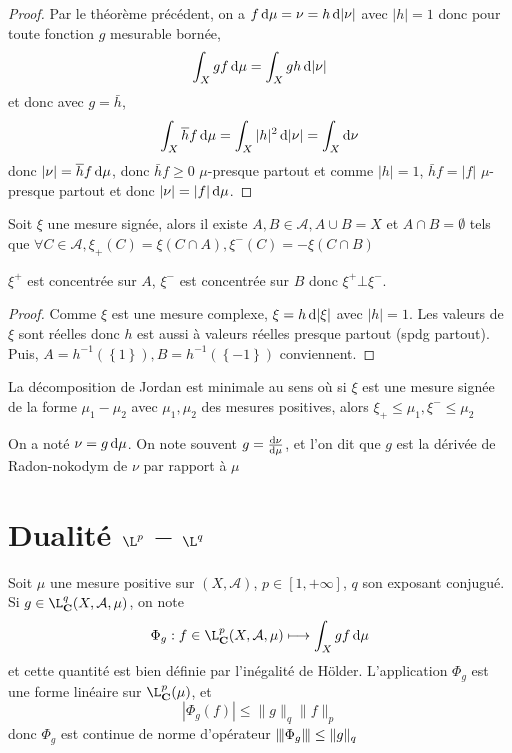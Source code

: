 \begin{proof}
Par le théorème précédent, on a $f\mathop{}\!\mathrm d \mu=\nu=h\mathop{}\!\mathrm d |\nu|$ avec $|h|=1$ donc pour toute fonction $g$ mesurable bornée, \[
\int_X gf\mathop{}\!\mathrm d\mu = \int_X gh\mathop{}\!\mathrm d |\nu|
\] 
et donc avec $g= \bar{h}$, \[
\int_X \overline{h}f\mathop{}\!\mathrm d\mu=\int_X |h|^2 \mathop{}\!\mathrm d |\nu|=\int_X \mathop{}\!\mathrm d \nu
\]
donc $|\nu|=\overline{h} f\mathop{}\!\mathrm d\mu$, donc $\bar{h} f\geq 0$ $\mu$-presque partout et comme  $|h|=1$,  $\bar{h}f=|f|$ $\mu$-presque partout et donc  $|\nu|=|f|\mathop{}\!\mathrm d \mu$.
\end{proof}

\begin{thm}
    Soit $\xi$ une mesure signée, alors il existe  $A, B \in  \mathcal  A, A\cup B=X$ et $A\cap B=\emptyset$ tels que  $\forall  C \in  \mathcal  A, \xi_+(C)=\xi(C\cap A), \xi^-(C)=-\xi(C\cap B)$
\end{thm}

\begin{rem}
$\xi^+$ est concentrée sur  $A$,  $\xi^-$ est concentrée sur  $B$ donc  $\xi^+\bot \xi^-$.
\end{rem}

\begin{proof}
    Comme $\xi$ est une mesure complexe,  $\xi=h\mathop{}\!\mathrm d |\xi|$ avec  $|h|=1$.  Les valeurs de $\xi$ sont réelles donc  $h$ est aussi à valeurs réelles presque partout (spdg partout). Puis, $A = h^{-1}(\left\{ 1 \right\} ), B = h^{-1}(\left\{ -1 \right\} )$ conviennent.
\end{proof}

\begin{prop}
La décomposition de Jordan est minimale au sens où si $\xi$ est une mesure signée de la forme  $\mu_1-\mu_2$ avec  $\mu_1, \mu_2$ des mesures positives, alors  $\xi_+\leq \mu_1, \xi^-\leq \mu_2$
\end{prop}

\begin{rem}
    On a noté $\nu = g\mathop{}\!\mathrm d \mu$. On note souvent  $g=\frac{\mathop{}\!\mathrm d \nu}{\mathop{}\!\mathrm d \mu}$, et l'on dit que  $g$ est la dérivée de Radon-nokodym de  $\nu$ par rapport à  $\mu$
\end{rem}

\section{Dualité \texorpdfstring{$\L^p$ -- $\L^q$}{L^p - L^q}}

Soit $\mu$ une mesure positive sur  $(X, \mathcal  A)$, $p \in  [1, +\infty]$, $q$ son exposant conjugué. Si  $g \in  \L^q_{\C}(X, \mathcal  A, \mu)$, on note \[
    \Phi_g:f \in  \L^p_{\C}(X, \mathcal  A, \mu)\longmapsto \int_X gf\diff\mu
\] 
et cette quantité est bien définie par l'inégalité de Hölder. L'application $\Phi_g$ est une forme linéaire sur  $\L^p_{\C}(\mu)$, et \[
    |\Phi_g(f)|\leq \|g\|_q \|f\|_p
\] 
donc $\Phi_g$ est continue de norme d'opérateur  $\|\hspace{-1pt}|\Phi_g\|\hspace{-1pt}|\leq \|g\|_q$

